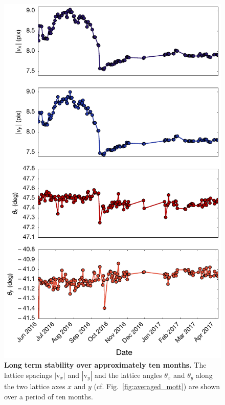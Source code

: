 \documentclass[twocolumn,aip,rsi,reprint,bibnotes]{revtex4-1}
\begin{document}
\begin{figure}
\begin{center}
    \includegraphics[width=\columnwidth]{Figure14.pdf}
    \caption{\textbf{Long term stability over approximately ten months.} The lattice spacings $|\mathrm{v}_x|$ and $|\mathrm{v}_y|$ and the lattice angles $\theta_x$ and $\theta_y$ along the two lattice axes $x$ and $y$ (cf. Fig.~\ref{fig:averaged_mott}) are shown over a period of ten months.}\label{fig:long_term_stability}
  \end{center}
\end{figure}
\end{document}
